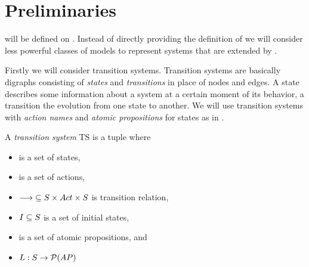 \documentclass[preview]{standalone}
\begin{document}
\section{Preliminaries} \label{ch:prelim}

\viewsNC will be defined on \chgphsN. Instead of directly providing the definition of \achgphN we will consider less powerful classes of models to represent systems that are extended by \chgphsN.

Firstly we will consider transition systems. Transition systems are basically digraphs consisting of \emph{states} and \emph{transitions} in place of nodes and edges. A state describes some information about a system at a certain moment of its behavior, a transition the evolution from one state to another. We will use transition systems with \emph{action names} and \emph{atomic propositions} for states as in \cite{Baier2008}.

\begin{definition}
	A \emph{transition system} TS is a tuple \transitionsystem where
	\begin{itemize}
		\item \states is a set of states,
		\item \actions is a set of actions,
		\item ${\longrightarrow} \subseteq {S} \times {Act} \times {S}$ is transition relation,
		\item ${I} \subseteq {S}$ is a set of initial states,
		\item \atomicprops is a set of atomic propositions, and
		\item ${L} : {S} \to {\mathcal{P}(\ensuremath{{AP}})}$
	\end{itemize}
\end{definition}

\end{document}
